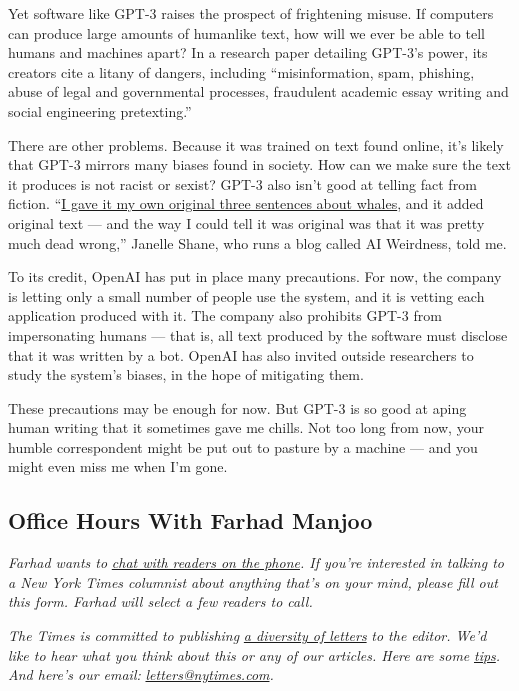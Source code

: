 Yet software like GPT-3 raises the prospect of frightening misuse. If
computers can produce large amounts of humanlike text, how will we ever
be able to tell humans and machines apart? In a research paper detailing
GPT-3's power, its creators cite a litany of dangers, including
``misinformation, spam, phishing, abuse of legal and governmental
processes, fraudulent academic essay writing and social engineering
pretexting.''

There are other problems. Because it was trained on text found online,
it's likely that GPT-3 mirrors many biases found in society. How can we
make sure the text it produces is not racist or sexist? GPT-3 also isn't
good at telling fact from fiction.
``\href{https://aiweirdness.com/post/623543644426829825/facts-about-whales}{I
gave it my own original three sentences about whales}, and it added
original text --- and the way I could tell it was original was that it
was pretty much dead wrong,'' Janelle Shane, who runs a blog called AI
Weirdness, told me.

To its credit, OpenAI has put in place many precautions. For now, the
company is letting only a small number of people use the system, and it
is vetting each application produced with it. The company also prohibits
GPT-3 from impersonating humans --- that is, all text produced by the
software must disclose that it was written by a bot. OpenAI has also
invited outside researchers to study the system's biases, in the hope of
mitigating them.

These precautions may be enough for now. But GPT-3 is so good at aping
human writing that it sometimes gave me chills. Not too long from now,
your humble correspondent might be put out to pasture by a machine ---
and you might even miss me when I'm gone.

\hypertarget{office-hours-with-farhad-manjoo}{%
\subsection{Office Hours With Farhad
Manjoo}\label{office-hours-with-farhad-manjoo}}

\emph{Farhad wants to}
\href{https://www.nytimes.com/2019/05/16/opinion/farhad-office-hours.html?module=inline}{\emph{chat
with readers on the phone}}\emph{. If you're interested in talking to a
New York Times columnist about anything that's on your mind, please fill
out this form. Farhad will select a few readers to call.}

\emph{The Times is committed to publishing}
\href{https://www.nytimes.com/2019/01/31/opinion/letters/letters-to-editor-new-york-times-women.html}{\emph{a
diversity of letters}} \emph{to the editor. We'd like to hear what you
think about this or any of our articles. Here are some}
\href{https://help.nytimes.com/hc/en-us/articles/115014925288-How-to-submit-a-letter-to-the-editor}{\emph{tips}}\emph{.
And here's our email:}
\href{mailto:letters@nytimes.com}{\emph{letters@nytimes.com}}\emph{.}

